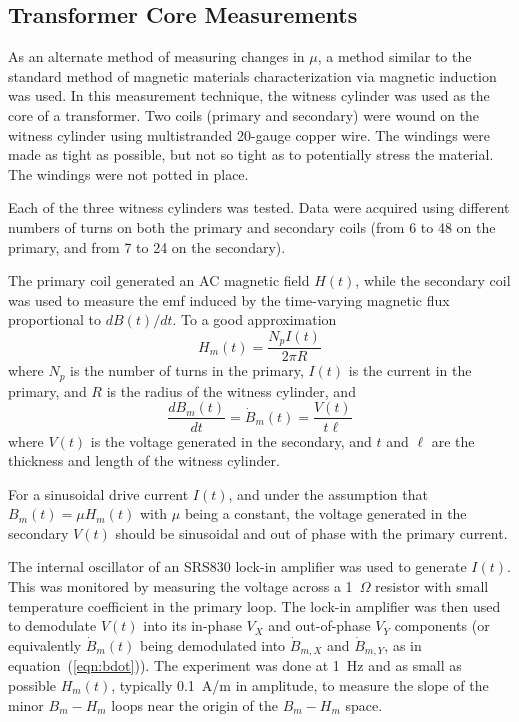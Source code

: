 
\subsection{Transformer Core Measurements}
\label{sec:transformer}

As an alternate method of measuring changes in $\mu$, a method similar
to the standard method of magnetic materials characterization via
magnetic induction was used.  In this measurement technique, the
witness cylinder was used as the core of a transformer.  Two coils
(primary and secondary) were wound on the witness cylinder using
multistranded 20-gauge copper wire.  The windings were made as tight
as possible, but not so tight as to potentially stress the material.
The windings were not potted in place.

Each of the three witness cylinders was tested.  Data were acquired
using different numbers of turns on both the primary and secondary
coils (from 6 to 48 on the primary, and from 7 to 24 on the
secondary).



The primary coil generated an AC magnetic field $H(t)$, while the
secondary coil was used to measure the emf induced by the time-varying
magnetic flux proportional to $dB(t)/dt$.  To a good
approximation
\begin{equation}
H_m(t)=\frac{N_pI(t)}{2\pi R}
\end{equation}
where $N_p$ is the number of turns in the primary, $I(t)$ is the
current in the primary, and $R$ is the radius of the witness cylinder,
and
\begin{equation}
\frac{dB_m(t)}{dt}=\dot{B}_m(t)=\frac{V(t)}{t\ell}
\label{eqn:bdot}
\end{equation}
where $V(t)$ is the voltage generated in the secondary, and $t$ and
$\ell$ are the thickness and length of the witness cylinder.

For a sinusoidal drive current $I(t)$, and under the assumption that
$B_m(t)=\mu H_m(t)$ with $\mu$ being a constant, the voltage generated
in the secondary $V(t)$ should be sinusoidal and out of phase with the
primary current.

The internal oscillator of an SRS830 lock-in amplifier was used to
generate $I(t)$.  This was monitored by measuring the voltage across a
1~$\Omega$ resistor with small temperature coefficient in the primary
loop.  The lock-in amplifier was then used to demodulate $V(t)$ into
its in-phase $V_X$ and out-of-phase $V_Y$ components (or equivalently
$\dot{B}_m(t)$ being demodulated into $\dot{B}_{m,X}$ and
$\dot{B}_{m,Y}$, as in equation~(\ref{eqn:bdot})).  The experiment was
done at 1~Hz and as small as possible $H_m(t)$, typically 0.1~A/m in
amplitude, to measure the slope of the minor $B_m-H_m$ loops near the
origin of the $B_m-H_m$ space.

